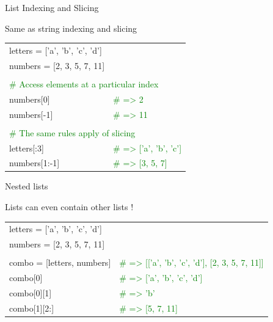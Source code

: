 \documentclass[serif, aspectratio=169]{beamer}
\newcommand{\tgreen}[1]{\textcolor{green}{#1}}
\newenvironment{CLI} %
    {
    \noindent
    \ttfamily 
    \footnotesize
    \begin{tcolorbox}[colback=gray!150,colframe=black]
    \color{white}
    \begin{tabular}{p{4.5cm}p{7.5cm}}
    }
    { 
    \end{tabular}
    \end{tcolorbox}
    }
\begin{document}
\begin{frame}{List Indexing and Slicing}
    \begin{block}{Same as string indexing and slicing}
        \vspace{2pt}
        \begin{CLI}
            \multicolumn{2}{l}{letters = ['a', 'b', 'c', 'd']} \\
            numbers = [2, 3, 5, 7, 11] & \\
            \pause
            & \\
            \multicolumn{2}{l}{\tgreen{\# Access elements at a particular index}} \\
            numbers[0] & \tgreen{\# => 2} \\
            numbers[-1] & \tgreen{\# => 11}  \\
            \pause
            & \\
            \multicolumn{2}{l}{\tgreen{\# The same rules apply of slicing}} \\
            letters[:3] & \tgreen{\# => ['a', 'b', 'c']} \\
            numbers[1:-1] & \tgreen{\# => [3, 5, 7]} \\
        \end{CLI}
    \end{block}
\end{frame}

\begin{frame}{Nested lists}
    \begin{block}{Lists can even contain other lists !}
        \vspace{2pt}
        \begin{CLI}
            \multicolumn{2}{l}{letters = ['a', 'b', 'c', 'd']} \\
            numbers = [2, 3, 5, 7, 11] & \\
            \pause
            & \\
            combo = [letters, numbers] & \tgreen{\# => [['a', 'b', 'c', 'd'], [2, 3, 5, 7, 11]]} \\
            combo[0] & \tgreen{\# => ['a', 'b', 'c', 'd']} \\
            combo[0][1] & \tgreen{\# => 'b'} \\
            combo[1][2:] & \tgreen{\# => [5, 7, 11]} \\
        \end{CLI}
    \end{block}
\end{frame}
\end{document}
